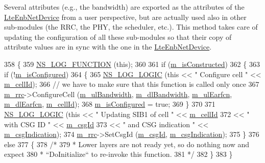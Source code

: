 Several attributes (e.\+g., the bandwidth) are exported as the attributes of the \hyperlink{classns3_1_1LteEnbNetDevice}{Lte\+Enb\+Net\+Device} from a user perspective, but are actually used also in other sub-\/modules (the R\+RC, the P\+HY, the scheduler, etc.). This method takes care of updating the configuration of all these sub-\/modules so that their copy of attribute values are in sync with the one in the \hyperlink{classns3_1_1LteEnbNetDevice}{Lte\+Enb\+Net\+Device}. 
\begin{DoxyCode}
358 \{
359   \hyperlink{log-macros-disabled_8h_a90b90d5bad1f39cb1b64923ea94c0761}{NS\_LOG\_FUNCTION} (\textcolor{keyword}{this});
360 
361   \textcolor{keywordflow}{if} (\hyperlink{classns3_1_1LteEnbNetDevice_a56d640f8ffe3e2f39c49ab37407e56b9}{m\_isConstructed})
362     \{
363       \textcolor{keywordflow}{if} (!\hyperlink{classns3_1_1LteEnbNetDevice_a4a5da0eaa59271c590fab53ed54b5e0d}{m\_isConfigured})
364         \{
365           \hyperlink{group__logging_ga88acd260151caf2db9c0fc84997f45ce}{NS\_LOG\_LOGIC} (\textcolor{keyword}{this} << \textcolor{stringliteral}{" Configure cell "} << \hyperlink{classns3_1_1LteEnbNetDevice_a8e83ce1a84658cd8a99ffe3c6981e067}{m\_cellId});
366           \textcolor{comment}{// we have to make sure that this function is called only once}
367           \hyperlink{classns3_1_1LteEnbNetDevice_a82f434e1c6e250945e6b0c48fb3c9ea7}{m\_rrc}->ConfigureCell (\hyperlink{classns3_1_1LteEnbNetDevice_a2dfb0b63b26f94d4e19aa93ddf7a9187}{m\_ulBandwidth}, \hyperlink{classns3_1_1LteEnbNetDevice_a3b948a066eba813c9dd4a5bcc21e8073}{m\_dlBandwidth}, 
      \hyperlink{classns3_1_1LteEnbNetDevice_a0760bf2c3e1199b2196c01d99d7221b7}{m\_ulEarfcn}, \hyperlink{classns3_1_1LteEnbNetDevice_a83a5acd3846339fc92e5b7693fa0faef}{m\_dlEarfcn}, \hyperlink{classns3_1_1LteEnbNetDevice_a8e83ce1a84658cd8a99ffe3c6981e067}{m\_cellId});
368           \hyperlink{classns3_1_1LteEnbNetDevice_a4a5da0eaa59271c590fab53ed54b5e0d}{m\_isConfigured} = \textcolor{keyword}{true};
369         \}
370 
371       \hyperlink{group__logging_ga88acd260151caf2db9c0fc84997f45ce}{NS\_LOG\_LOGIC} (\textcolor{keyword}{this} << \textcolor{stringliteral}{" Updating SIB1 of cell "} << \hyperlink{classns3_1_1LteEnbNetDevice_a8e83ce1a84658cd8a99ffe3c6981e067}{m\_cellId}
372                          << \textcolor{stringliteral}{" with CSG ID "} << \hyperlink{classns3_1_1LteEnbNetDevice_ae2d1e7c4978965069e4ae7acd01d6c48}{m\_csgId}
373                          << \textcolor{stringliteral}{" and CSG indication "} << \hyperlink{classns3_1_1LteEnbNetDevice_ac034873d43e9dce02622ca6c311171e2}{m\_csgIndication});
374       \hyperlink{classns3_1_1LteEnbNetDevice_a82f434e1c6e250945e6b0c48fb3c9ea7}{m\_rrc}->SetCsgId (\hyperlink{classns3_1_1LteEnbNetDevice_ae2d1e7c4978965069e4ae7acd01d6c48}{m\_csgId}, \hyperlink{classns3_1_1LteEnbNetDevice_ac034873d43e9dce02622ca6c311171e2}{m\_csgIndication});
375     \}
376   \textcolor{keywordflow}{else}
377     \{
378       \textcolor{comment}{/*}
379 \textcolor{comment}{       * Lower layers are not ready yet, so do nothing now and expect}
380 \textcolor{comment}{       * ``DoInitialize`` to re-invoke this function.}
381 \textcolor{comment}{       */}
382     \}
383 \}
\end{DoxyCode}


